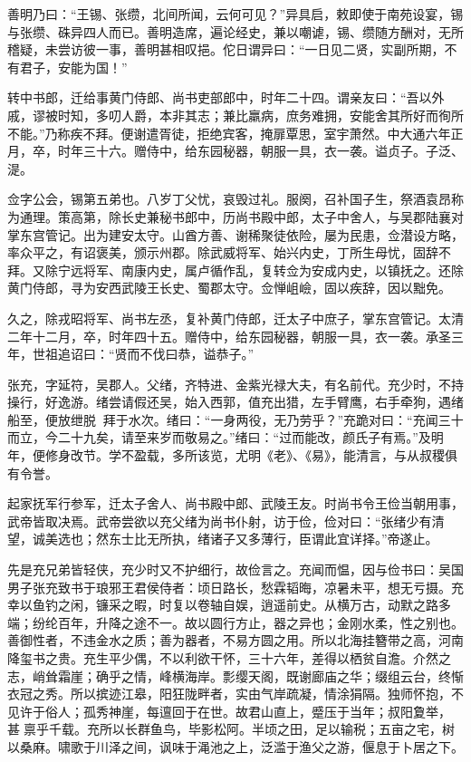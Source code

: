 \documentclass[12pt,UTF8]{ctexbook}
\begin{document}
善明乃曰：“王锡、张缵，北间所闻，云何可见？”异具启，敕即使于南苑设宴，锡与张缵、硃异四人而已。善明造席，遍论经史，兼以嘲谑，锡、缵随方酬对，无所稽疑，未尝访彼一事，善明甚相叹挹。佗日谓异曰：“一日见二贤，实副所期，不有君子，安能为国！”

转中书郎，迁给事黄门侍郎、尚书吏部郎中，时年二十四。谓亲友曰：“吾以外戚，谬被时知，多叨人爵，本非其志；兼比羸病，庶务难拥，安能舍其所好而徇所不能。”乃称疾不拜。便谢遣胥徒，拒绝宾客，掩扉覃思，室宇萧然。中大通六年正月，卒，时年三十六。赠侍中，给东园秘器，朝服一具，衣一袭。谥贞子。子泛、湜。

佥字公会，锡第五弟也。八岁丁父忧，哀毁过礼。服阕，召补国子生，祭酒袁昂称为通理。策高第，除长史兼秘书郎中，历尚书殿中郎，太子中舍人，与吴郡陆襄对掌东宫管记。出为建安太守。山酋方善、谢稀聚徒依险，屡为民患，佥潜设方略，率众平之，有诏褒美，颁示州郡。除武威将军、始兴内史，丁所生母忧，固辞不拜。又除宁远将军、南康内史，属卢循作乱，复转佥为安成内史，以镇抚之。还除黄门侍郎，寻为安西武陵王长史、蜀郡太守。佥惮岨嶮，固以疾辞，因以黜免。

久之，除戎昭将军、尚书左丞，复补黄门侍郎，迁太子中庶子，掌东宫管记。太清二年十二月，卒，时年四十五。赠侍中，给东园秘器，朝服一具，衣一袭。承圣三年，世祖追诏曰：“贤而不伐曰恭，谥恭子。”

张充，字延符，吴郡人。父绪，齐特进、金紫光禄大夫，有名前代。充少时，不持操行，好逸游。绪尝请假还吴，始入西郭，值充出猎，左手臂鹰，右手牵狗，遇绪船至，便放绁脱，拜于水次。绪曰：“一身两役，无乃劳乎？”充跪对曰：“充闻三十而立，今二十九矣，请至来岁而敬易之。”绪曰：“过而能改，颜氏子有焉。”及明年，便修身改节。学不盈载，多所该览，尤明《老》、《易》，能清言，与从叔稷俱有令誉。

起家抚军行参军，迁太子舍人、尚书殿中郎、武陵王友。时尚书令王俭当朝用事，武帝皆取决焉。武帝尝欲以充父绪为尚书仆射，访于俭，俭对曰：“张绪少有清望，诚美选也；然东士比无所执，绪诸子又多薄行，臣谓此宜详择。”帝遂止。

先是充兄弟皆轻侠，充少时又不护细行，故俭言之。充闻而愠，因与俭书曰：吴国男子张充致书于琅邪王君侯侍者：顷日路长，愁霖韬晦，凉暑未平，想无亏摄。充幸以鱼钓之闲，镰采之暇，时复以卷轴自娱，逍遥前史。从横万古，动默之路多端；纷纶百年，升降之途不一。故以圆行方止，器之异也；金刚水柔，性之别也。善御性者，不违金水之质；善为器者，不易方圆之用。所以北海挂簪带之高，河南降玺书之贵。充生平少偶，不以利欲干怀，三十六年，差得以栖贫自澹。介然之志，峭耸霜崖；确乎之情，峰横海岸。彯缨天阁，既谢廊庙之华；缀组云台，终惭衣冠之秀。所以摈迹江皋，阳狂陇畔者，实由气岸疏凝，情涂狷隔。独师怀抱，不见许于俗人；孤秀神崖，每邅回于在世。故君山直上，蹙压于当年；叔阳夐举，甚禀乎千载。充所以长群鱼鸟，毕影松阿。半顷之田，足以输税；五亩之宅，树以桑麻。啸歌于川泽之间，讽味于渑池之上，泛滥于渔父之游，偃息于卜居之下。
\end{document}
